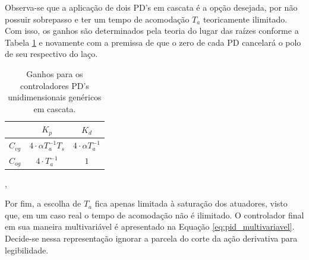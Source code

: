 \documentclass[main.tex]{subfiles}
\begin{document}
Observa-se que a aplicação de dois PD's em cascata é a opção desejada, por não possuir sobrepasso e ter um tempo de acomodação $T_a$ teoricamente ilimitado. Com isso, os ganhos são determinados pela teoria do lugar das raízes \cite{controle_ufrgs} conforme a Tabela \ref{tab:controlador_pd} e novamente com a premissa de que o zero de cada PD cancelará o polo de seu respectivo do laço.

\begin{table}[!h]
	\centering
	\caption{Ganhos para os controladores PD's unidimensionais genéricos em cascata.}
	\begin{tabular}{|c|c|c|}
		\cline{2-3}
		\multicolumn{1}{c|}{} & $K_p$  & $K_d$ \\\hline
		$C_{vg}$ & $4\cdot \alpha T_a^{-1} T_s$ & $4 \cdot\alpha T_a^{-1}$ \\\hline
		$C_{og}$ & $4\cdot T_a^{-1}$ & $1$ \\\hline
	\end{tabular}
	\label{tab:controlador_pd}
\end{table},


Por fim, a escolha de $T_a$ fica apenas limitada à saturação dos atuadores, visto que, em um caso real o tempo de acomodação não é ilimitado. O controlador final em sua maneira multivariável é apresentado na Equação \ref{eq:pid_multivariavel}. Decide-se nessa representação ignorar a parcela do corte da ação derivativa para legibilidade.
\end{document}
